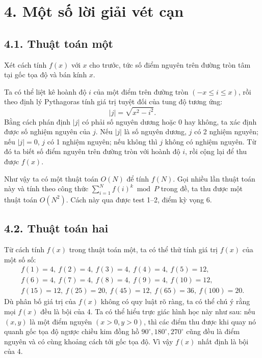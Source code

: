 \documentclass[11pt]{article}
\begin{document}
\section*{4. Một số lời giải vét cạn}

\subsection*{4.1. Thuật toán một}

Xét cách tính \(f(x)\) với \(x\) cho trước, tức số điểm nguyên trên đường tròn
tâm tại gốc tọa độ và bán kính \(x\).

Ta có thể liệt kê hoành độ \(i\) của một điểm trên đường tròn
\((-x\le i\le x)\), rồi theo định lý Pythagoras tính giá trị tuyệt đối của
tung độ tương ứng:
\[
  |j|=\sqrt{x^2-i^2}.
\]
Bằng cách phán định \(|j|\) có phải số nguyên dương hoặc 0 hay không, ta xác
định được số nghiệm nguyên của \(j\). Nếu \(|j|\) là số nguyên dương, \(j\) có
2 nghiệm nguyên; nếu \(|j|=0\), \(j\) có 1 nghiệm nguyên; nếu không thì \(j\)
không có nghiệm nguyên. Từ đó ta biết số điểm nguyên trên đường tròn với
hoành độ \(i\), rồi cộng lại để thu được \(f(x)\).

Như vậy ta có một thuật toán \(O(N)\) để tính \(f(N)\). Gọi nhiều lần thuật
toán này và tính theo công thức \(\sum_{i=1}^{N} f(i)^k\bmod P\) trong đề,
ta thu được một thuật toán \(O(N^2)\). Cách này qua được test 1--2, điểm kỳ
vọng 6.

\subsection*{4.2. Thuật toán hai}

Từ cách tính \(f(x)\) trong thuật toán một, ta có thể thử tính giá trị
\(f(x)\) của một số số:
\[
\begin{gathered}
f(1)=4,\ f(2)=4,\ f(3)=4,\ f(4)=4,\ f(5)=12,\\
f(6)=4,\ f(7)=4,\ f(8)=4,\ f(9)=4,\ f(10)=12,\\
f(15)=12,\ f(25)=20,\ f(45)=12,\ f(65)=36,\ f(100)=20.
\end{gathered}
\]
Dù phân bố giá trị của \(f(x)\) không có quy luật rõ ràng, ta có thể chú ý
rằng mọi \(f(x)\) đều là bội của 4. Ta có thể hiểu trực giác hình học này như
sau: nếu \((x,y)\) là một điểm nguyên \((x>0,y>0)\), thì các điểm thu được khi
quay nó quanh gốc tọa độ ngược chiều kim đồng hồ \(90^\circ,180^\circ,270^\circ\)
cũng đều là điểm nguyên và có cùng khoảng cách tới gốc tọa độ. Vì vậy \(f(x)\)
nhất định là bội của 4.
\end{document}
